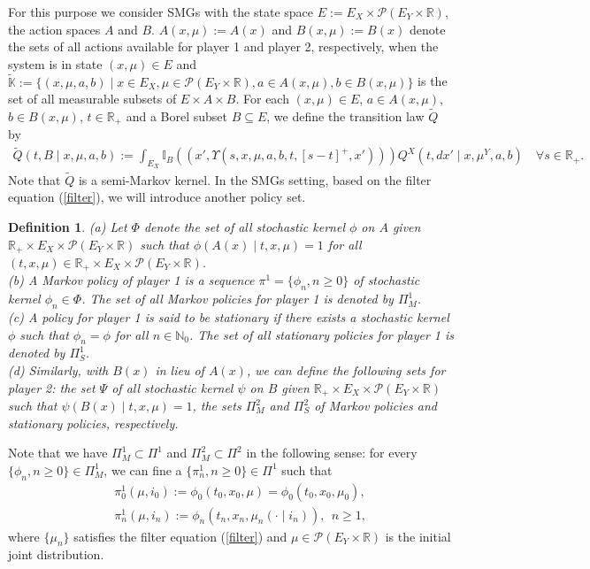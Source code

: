 \documentclass[12pt]{article}
\newtheorem{definition}{Definition}
\begin{document}
For this purpose we consider  SMGs with the state space $E:=E_X\times \mathscr{P}(E_Y\times\mathbb{R})$,
the action spaces $A$ and $B$.
$A(x,\mu):=A(x)$ and $B(x,\mu):=B(x)$ denote the sets of all actions available for player 1 and player 2, respectively, when the system is in state $(x,\mu)\in E$ and
$\tilde{\mathbb{K}}:=\{(x,\mu,a,b)\mid x\in E_X,\mu\in\mathscr{P}(E_Y\times\mathbb{R}),a\in A(x,\mu), b\in B(x,\mu)\}$ is the set of all measurable subsets of $E\times A\times B$.
For each
$(x,\mu)\in E$, $a\in A(x,\mu)$, $b\in B(x,\mu)$, $t\in\mathbb{R}_+$ and a Borel subset $B\subseteq E$, we  define the transition law  $\tilde{Q}$ by
\begin{eqnarray*}
	\tilde{Q}(t,B\mid x,\mu,a,b):=\int_{E_X}\mathbb{I}_B((x',\Upsilon(s,x,\mu,a,b,t,[s-t]^+,x')))
	Q^X(t,dx'\mid x,\mu^Y,a,b)\quad\forall s\in\mathbb{R}_+.
\end{eqnarray*}
Note that $\tilde{Q}$ is a semi-Markov kernel.
In the SMGs setting, based on the filter equation (\ref{filter}), we will introduce another policy set.
 \begin{definition}
(a) Let $\Phi$ denote the set of all stochastic kernel $\phi$ on $A$ given $\mathbb{R}_+\times E_X\times \mathscr{P}(E_Y\times \mathbb{R})$ such that $\phi(A(x)\mid t,x,\mu)=1$ for all $(t,x,\mu)\in \mathbb{R}_+\times E_X\times \mathscr{P}(E_Y\times \mathbb{R})$.\\
(b) A Markov policy of player 1 is a sequence $\pi^1=\{\phi_n,n\ge 0\}$ of stochastic kernel $\phi_n\in\Phi$.
 The set of all Markov policies for player 1 is denoted by $\Pi_M^1$.\\
 (c) A policy for player 1 is said to be stationary if there exists a stochastic kernel $\phi$ such that $\phi_n=\phi$ for all $n\in\mathbb{N}_0$. The set of all stationary policies for player 1 is denoted by $\Pi_S^1$.\\
(d) Similarly, with $B(x)$ in lieu of $A(x)$, we can define the following sets for player 2: the set $\Psi$ of all stochastic kernel $\psi$ on $B$ given $\mathbb{R}_+\times E_X\times \mathscr{P}(E_Y\times \mathbb{R})$ such that $\psi(B(x)\mid t,x,\mu)=1$, 
the sets $\Pi_M^2$ and $\Pi_S^2$ of Markov policies and stationary policies, respectively.
 \end{definition}
Note that we have $\Pi_M^1\subset\Pi^1$ and $\Pi_M^2\subset\Pi^2$ in the following sense: 
for every $\{\phi_n,n\ge 0\}\in \Pi_M^1$, we can fine a  $\{\pi_n^1,n\ge 0\}\in \Pi^1$ such that
\begin{eqnarray*}
&&\pi_0^1(\mu,i_0):=\phi_0(t_0,x_0,\mu)=\phi_0(t_0,x_0,\mu_0),\\
&&\pi_n^1(\mu,i_n):=\phi_n(t_n,x_n,\mu_n(\cdot\mid i_n)),~~n\ge 1,
\end{eqnarray*}
where $\{\mu_n\}$ satisfies the filter equation (\ref{filter}) and  $\mu\in \mathscr{P}(E_Y\times\mathbb{R})$ is the initial joint distribution.
\end{document}
